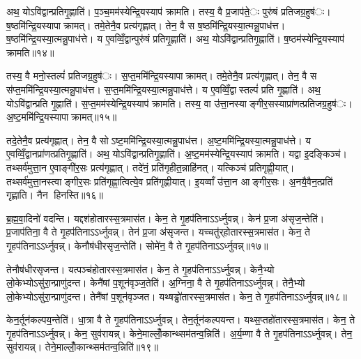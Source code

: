 अथ॒ योऽवि॑द्वान्प्रतिगृ॒ह्णाति॑। प॒ञ्च॒मम॑स्येन्द्रि॒यस्याप॑ क्रामति। तस्य॒ वै प्र॒जाप॑ते॒ः पुरु॑षं प्रतिजग्र॒हुष॑ः। ष॒ष्ठमि॑न्द्रि॒यस्यापाक्रामत्। तमे॒तेनै॒व प्रत्य॑गृह्णात्। तेन॒ वै स ष॒ष्ठमि॑न्द्रि॒यस्या॒त्मन्नु॒पाध॑त्त। ष॒ष्ठमि॑न्द्रि॒यस्या॒त्मन्नु॒पाध॑त्ते। य ए॒वव्विँ॒द्वान्पुरु॑षं प्रतिगृ॒ह्णाति॑। अथ॒ योऽवि॑द्वान्प्रतिगृ॒ह्णाति॑। ष॒ष्ठम॑स्येन्द्रि॒यस्याप॑ क्रामति॥१४॥

तस्य॒ वै मनो॒स्तल्पं॑ प्रतिजग्र॒हुष॑ः। स॒प्त॒ममि॑न्द्रि॒यस्यापाक्रामत्। तमे॒तेनै॒व प्रत्य॑गृह्णात्। तेन॒ वै स स॑प्त॒ममि॑न्द्रि॒यस्या॒त्मन्नु॒पाध॑त्त। स॒प्त॒ममि॑न्द्रि॒यस्या॒त्मन्नु॒पाध॑त्ते। य ए॒वव्विँ॒द्वास्तल्पं॑ प्रति गृ॒ह्णाति॑। अथ॒ योऽवि॑द्वान्प्रति गृ॒ह्णाति॑। स॒प्त॒मम॑स्येन्द्रि॒यस्याप॑ क्रामति। तस्य॒ वा उ॑त्ता॒नस्याङ्गीर॒सस्याप्रा॑णत्प्रतिजग्र॒हुष॑ः। अ॒ष्ट॒ममि॑न्द्रि॒यस्यापाक्रामत्॥१५॥

तदे॒तेनै॒व प्रत्य॑गृह्णात्। तेन॒ वै सोऽष्ट॒ममि॑न्द्रि॒यस्या॒त्मन्नु॒पाध॑त्त। अ॒ष्ट॒ममि॑न्द्रि॒यस्या॒त्मन्नु॒पाध॑त्ते। य ए॒वव्विँ॒द्वानप्रा॑णत्प्रतिगृ॒ह्णाति॑। अथ॒ योऽवि॑द्वान्प्रतिगृ॒ह्णाति॑। अ॒ष्ट॒मम॑स्येन्द्रि॒यस्याप॑ क्रामति। यद्वा इ॒दङ्किञ्च॑। तथ्सर्व॑मुत्ता॒न ए॒वाङ्गी॑र॒सः प्रत्य॑गृह्णात्। तदे॑नं॒ प्रति॑गृहीत॒न्नाहि॑नत्। यत्किञ्च॑ प्रतिगृह्णी॒यात्। तथ्सर्व॑मुत्ता॒नस्त्वाङ्गीर॒सः प्रति॑गृह्णा॒त्वित्ये॒व प्रति॑गृह्णीयात्। इ॒यव्वाँ उ॑त्ता॒न आङ्गीर॒सः। अ॒नयै॒वैन॒त्प्रति॑ गृह्णाति। नैन हिनस्ति॥१६॥


ब्र॒ह्म॒वा॒दिनो॑ वदन्ति। यद्दश॑होतारस्स॒त्रमास॑त। केन॒ ते गृ॒हप॑तिनाऽऽर्ध्नुवन्न्। केन॑ प्र॒जा अ॑सृज॒न्तेति॑। प्र॒जाप॑तिना॒ वै ते गृ॒हप॑तिनाऽऽर्ध्नुवन्न्। तेन॑ प्र॒जा अ॑सृजन्त। यच्चतु॑र्‌होतारस्स॒त्रमास॑त। केन॒ ते गृ॒हप॑तिनाऽऽर्ध्नुवन्न्। केनौष॑धीरसृज॒न्तेति॑। सोमे॑न॒ वै ते गृ॒हप॑तिनाऽऽर्ध्नुवन्न्॥१७॥

तेनौष॑धीरसृजन्त। यत्पञ्च॑होतारस्स॒त्रमास॑त। केन॒ ते गृ॒हप॑तिनाऽऽर्ध्नुवन्न्। केनै॒भ्यो लो॒केभ्योऽसु॑रा॒न्प्राणु॑दन्त। केनै॑षां प॒शून॑वृञ्ज॒तेति॑। अ॒ग्निना॒ वै ते गृ॒हप॑तिनाऽऽर्ध्नुवन्न्। तेनै॒भ्यो लो॒केभ्योऽसु॑रा॒न्प्राणु॑दन्त। तेनै॑षां प॒शून॑वृञ्जत। यथ्षड्ढो॑तारस्स॒त्रमास॑त। केन॒ ते गृ॒हप॑तिनाऽऽर्ध्नुवन्न्॥१८॥

केन॒र्तून॑कल्पय॒न्तेति॑। धा॒त्रा वै ते गृ॒हप॑तिनाऽऽर्ध्नुवन्न्। तेन॒र्तून॑कल्पयन्त। यथ्स॒प्तहो॑तारस्स॒त्रमास॑त। केन॒ ते गृ॒हप॑तिनाऽऽर्ध्नुवन्न्। केन॒ सुव॑रायन्न्। केने॒माल्लोँ॒कान्थ्सम॑तन्व॒न्निति॑। अ॒र्य॒म्णा वै ते गृ॒हप॑तिनाऽऽर्ध्नुवन्न्। तेन॒ सुव॑रायन्न्। तेने॒माल्लोँ॒कान्थ्सम॑तन्व॒न्निति॑॥१९॥

